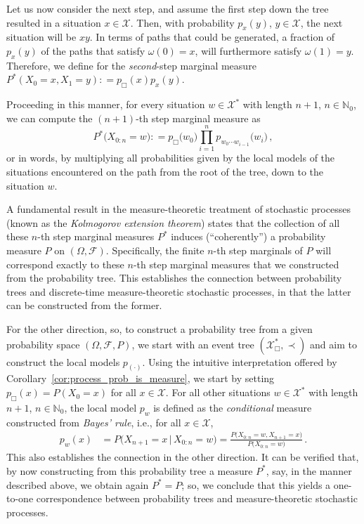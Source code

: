 \documentclass[graybox]{svmult}
\newcommand{\nats}{\mathbb{N}}
\newcommand{\natswith}{\nats_{0}}
\newcommand{\states}{\mathcal{X}}
\newcommand{\coloneqq}{:\!=}
\begin{document}
Let us now consider the next step, and assume the first step down the tree resulted in a situation $x\in\states$. Then, with probability $p_x(y)$, $y\in\states$, the next situation will be $xy$. In terms of paths that could be generated, a fraction of $p_x(y)$ of the paths that satisfy $\omega(0)=x$, will furthermore satisfy $\omega(1)=y$. Therefore, we define for the \emph{second}-step marginal measure $P^*(X_0=x,X_1=y)\coloneqq p_\Box(x)p_x(y)$.

Proceeding in this manner, for every situation $w\in\states^*$ with length $n+1$, $n\in\natswith$, we can compute the $(n+1)$-th step marginal measure as
\begin{equation*}
P^*\bigl(X_{0:n}=w\bigr) \coloneqq p_\Box\bigl(w_0\bigr)\prod_{i=1}^{n} p_{w_0\cdots w_{i-1}}\bigl(w_i\bigr)\,,
\end{equation*}
or in words, by multiplying all probabilities given by the local models of the situations encountered on the path from the root of the tree, down to the situation $w$.

A fundamental result in the measure-theoretic treatment of stochastic processes (known as the \emph{Kolmogorov extension theorem}) states that the collection of all these $n$-th step marginal measures $P^*$ induces (``coherently'') a probability measure $P$ on $(\Omega,\mathcal{F})$. Specifically, the finite $n$-th step marginals of $P$ will correspond exactly to these $n$-th step marginal measures that we constructed from the probability tree. This establishes the connection between probability trees and discrete-time measure-theoretic stochastic processes, in that the latter can be constructed from the former.

For the other direction, so, to construct a probability tree from a given probability space $(\Omega,\mathcal{F},P)$, we start with an event tree $(\states^*_\Box,\prec)$ and aim to construct the local models $p_{(\cdot)}$. Using the intuitive interpretation offered by Corollary~\ref{cor:process_prob_is_measure}, we start by setting $p_\Box(x)=P(X_0=x)$ for all $x\in\states$. For all other situations $w\in\states^*$ with length $n+1$, $n\in\natswith$, the local model $p_w$ is defined as the \emph{conditional} measure constructed from \emph{Bayes' rule}, i.e., for all $x\in\states$,
\begin{align*}
p_w(x) &= P\bigl( X_{n+1}=x\,\big\vert\, X_{0:n}=w \bigr) = \frac{P\bigl(X_{0:n}=w, X_{n+1}=x\bigr)}{P\bigl( X_{0:n}=w \bigr)}\,.
\end{align*}
This also establishes the connection in the other direction. It can be verified that, by now constructing from this probability tree a measure $P^*$, say, in the manner described above, we obtain again $P^*=P$; so, we conclude that this yields a one-to-one correspondence between probability trees and measure-theoretic stochastic processes.
\end{document}
